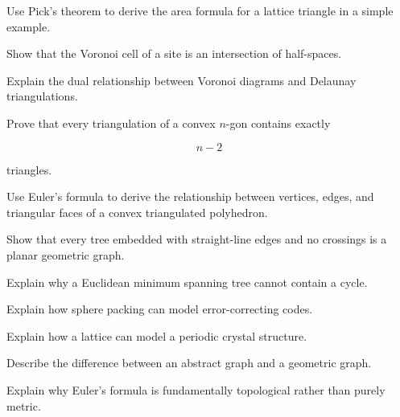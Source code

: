 \begin{exercise}[3]
Use Pick's theorem to derive the area formula for a lattice triangle in a
simple example.
\end{exercise}

\begin{exercise}[3]
Show that the Voronoi cell of a site is an intersection of half-spaces.
\end{exercise}

\begin{exercise}[3]
Explain the dual relationship between Voronoi diagrams and Delaunay
triangulations.
\end{exercise}

\begin{exercise}[3]
Prove that every triangulation of a convex \(n\)-gon contains exactly

\[
n-2
\]

triangles.
\end{exercise}

\begin{exercise}[3]
Use Euler's formula to derive the relationship between vertices, edges, and
triangular faces of a convex triangulated polyhedron.
\end{exercise}

\begin{exercise}[3]
Show that every tree embedded with straight-line edges and no crossings is a
planar geometric graph.
\end{exercise}

\begin{exercise}[3]
Explain why a Euclidean minimum spanning tree cannot contain a cycle.
\end{exercise}

\begin{exercise}[3]
Explain how sphere packing can model error-correcting codes.
\end{exercise}

\begin{exercise}[3]
Explain how a lattice can model a periodic crystal structure.
\end{exercise}

\begin{exercise}[3]
Describe the difference between an abstract graph and a geometric graph.
\end{exercise}

\begin{exercise}[3]
Explain why Euler's formula is fundamentally topological rather than purely
metric.
\end{exercise}

